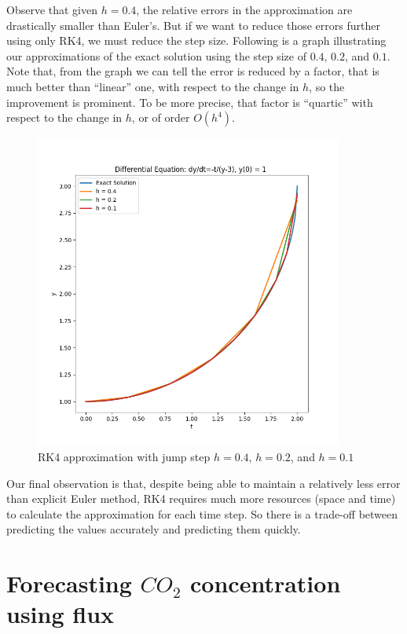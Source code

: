 \documentclass[a4paper]{article}
\numberwithin{equation}{section}
\begin{document}
Observe that given \( h = 0.4 \), the relative errors in the approximation are drastically smaller than Euler's. But if we want to reduce those errors further using only RK4, we must reduce the step size. Following is a graph illustrating our approximations of the exact solution using the step size of \( 0.4 \), \( 0.2 \), and \( 0.1 \). Note that, from the graph we can tell the error is reduced by a factor, that is much better than ``linear'' one, with respect to the change in \( h \), so the improvement is prominent. To be more precise, that factor is ``quartic'' with respect to the change in \( h \), or of order \( O(h^4) \).

\begin{figure}[H]
  \centering
  \includegraphics[width=0.9\textwidth]{plot_runge_kutta.png}
  \caption{RK4 approximation with jump step \( h = 0.4 \), \( h = 0.2 \), and \( h = 0.1 \)}
\end{figure}

Our final observation is that, despite being able to maintain a relatively less error than explicit Euler method, RK4 requires much more resources (space and time) to calculate the approximation for each time step. So there is a trade-off between predicting the values accurately and predicting them quickly.

\newpage
\section{Forecasting \texorpdfstring{\( CO_2 \)}{} concentration using flux}
\end{document}
